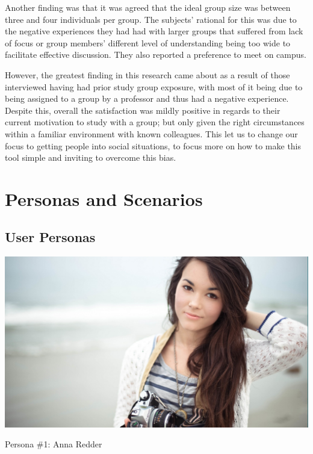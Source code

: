 \documentclass{sigchi-ext}
\begin{document}
Another finding was that it was agreed that the ideal group size was
between three and four individuals per group. The subjects' rational for
this was due to the negative experiences they had had with larger groups
that suffered from lack of focus or group members' different level of
understanding being too wide to facilitate effective discussion. They also
reported a preference to meet on campus.

However, the greatest finding in this research came about as a result of
those interviewed having had prior study group exposure, with most of it
being due to being assigned to a group by a professor and thus had a
negative experience. Despite this, overall the satisfaction was mildly
positive in regards to their current motivation to study with a group; but
only given the right circumstances within a familiar environment with known
colleagues. This let us to change our focus to getting people into social
situations, to focus more on how to make this tool simple and inviting to
overcome this bias.


\section{Personas and Scenarios}

\subsection{User Personas}

\begin{marginfigure}[-5pc]
  \begin{minipage}{\marginparwidth}
    \centering
  \includegraphics[width=0.9\marginparwidth]{figures/anna.png}
    \caption{Persona \#1: Anna Redder}~\label{fig:marginfig}
  \end{minipage}
\end{marginfigure}
\end{document}
